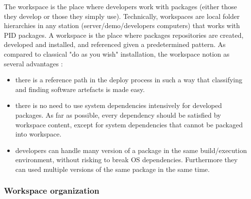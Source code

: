 \documentclass[12pt,a4paper]{article}
\begin{document}
The workspace is the place where developers work with packages (either those they develop or those they simply use). Technically, workspaces are local folder hierarchies in any station (server/demo/developers computers) that works with PID packages. A workspace is the place where packages repositories are created, developed and installed, and referenced given a predetermined pattern. As compared to classical "do as you wish" installation, the workspace notion as several advantages :
\begin{itemize}
\item there is a reference path in the deploy process in such a way that classifying and finding software artefacts is made easy.
\item there is no need to use system dependencies intensively for developed packages. As far as possible, every dependency should be satisfied by workspace content, except for system dependencies that cannot be packaged into workspace.
\item developers can handle many version of a package in the same build/execution environment, without risking to break OS dependencies. Furthermore they can used multiple versions of the same package in the same time.
\end{itemize}

\subsubsection{Workspace organization}
\end{document}
